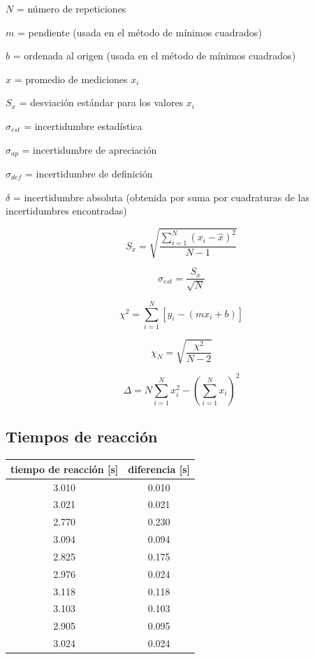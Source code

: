 \documentclass[DIV=calc, paper=a4, fontsize=11pt]{scrartcl}
\begin{document}
\begin{multicols}{2}
\noindent $N$ = número de repeticiones 

\noindent $m$ = pendiente (usada en el método de mínimos cuadrados)

\noindent $b$ = ordenada al origen (usada en el método de mínimos cuadrados)

\noindent $\hat{x}$ = promedio de mediciones $x_i$

\noindent $S_x$ = desviación estándar para los valores $x_i$

\noindent $\sigma_{est}$ = incertidumbre estadística

\noindent $\sigma_{ap}$ = incertidumbre de apreciación

\noindent $\sigma_{def}$ = incertidumbre de definición

\noindent $\delta$ = incertidumbre absoluta (obtenida por suma por cuadraturas de las incertidumbres encontradas)


\begin{equation*}
    S_x = \sqrt{\frac{\sum_{i=1}^{N} (x_i- \hat{x})^2}{N-1}}
\end{equation*}

\begin{equation*}
    \sigma_{est} = \frac{S_x}{\sqrt{N}}
\end{equation*}

\begin{equation*}
    \chi ^2 = \sum_{i=1}^{N} [y_i - (m x_i + b)]
\end{equation*}

\begin{equation*}
    \chi _N =\sqrt{\frac{\chi^2}{N-2}}
\end{equation*}

\begin{equation*}
    \Delta = N \sum_{i=1}^{N} x_{i}^{2} - (\sum_{i=1}^{N}x_i)^2
\end{equation*}


\subsection*{Tiempos de reacción}

\begin{tabular}{||c| c||} 
 \hline
 tiempo de reacción [s] & diferencia  [s] \\ [0.5ex] 
 \hline\hline
 3.010 & 0.010  \\ 
 3.021 &  0.021 \\
 2.770 & 0.230 \\
 3.094 &  0.094\\
 2.825 &  0.175\\
 2.976 & 0.024\\
 3.118 & 0.118\\
 3.103 & 0.103\\
 2.905 & 0.095\\
 3.024 & 0.024\\
  [1ex] 
 \hline
\end{tabular}


\end{multicols}
\end{document}
